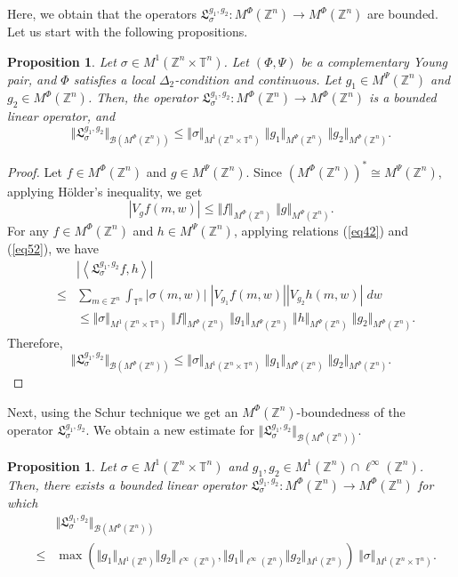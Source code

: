 \documentclass[a4paper,11pt, reqno]{amsart}
\theoremstyle{plain}
\newtheorem{proposition}[theorem]{Proposition}
\theoremstyle{definition}
\theoremstyle{remark}
\def \Z{{\mathbb Z}}
\def \T{{\mathbb T}}
\begin{document}
Here, we obtain that the operators $\mathfrak{L}^{g_1, g_2}_{\sigma} : M^{\Phi}(\Z^n) \to M^{\Phi}(\Z^n)$ are bounded. Let us start with the following propositions.
\begin{proposition}\label{pro4}  
Let $\sigma \in M^1(\Z^n \times \T^n)$. Let $\left(\Phi, \Psi \right)$ be a complementary Young pair, and $\Phi$ satisfies a local $\Delta_2$-condition and continuous. Let $g_1 \in  M^{\Psi}(\Z^n)$ and $g_2 \in M^{\Phi}(\Z^n)$. Then, the operator $\mathfrak{L}^{g_1, g_2}_{\sigma}: M^{\Phi}(\Z^n) \to M^{\Phi}(\Z^n)$ is a bounded linear operator, and 
\[\Vert \mathfrak{L}^{g_1, g_2}_{\sigma} \Vert_{\mathcal{B}(M^{\Phi}(\Z^n))} \leq  \Vert \sigma  \Vert_{M^1(\Z^n \times \T^n)} \; \Vert g_1 \Vert_{ M^{\Psi}(\Z^n)} \; \Vert g_2 \Vert_{M^{\Phi}(\Z^n)}. \] 
\end{proposition}
\begin{proof}
Let $f \in M^{\Phi}(\Z^n)$ and $g \in M^{\Psi}(\Z^n)$. Since $(M^{\Phi}(\Z^n))^* \cong M^{\Psi}(\Z^n)$, applying H\"older's inequality, we get
\begin{equation}\label{eq52}
\left| V_{g} f (m, w) \right| \leq \Vert f  \Vert_{M^{\Phi}(\Z^n)} \; \Vert g  \Vert_{M^{\Psi}(\Z^n)}. 
\end{equation} 
For any $f \in M^{\Phi}(\Z^n)$ and $h \in M^{\Psi}(\Z^n)$, applying relations (\ref{eq42}) and (\ref{eq52}), we have
\begin{eqnarray*}
&& \left| \left\langle \mathfrak{L}^{g_1, g_2}_{\sigma}f, h \right\rangle \right| \\
& \leq & \sum_{m \in \Z^n}  \int_{\T^n} |\sigma(m, w)| \; \left|V_{g_1}f(m, w) \right| \left|   V_{g_2}h(m, w) \right| \; dw \\
&& \leq \Vert \sigma \Vert_{M^1(\Z^n \times \T^n)} \; \Vert f \Vert_{M^{\Phi}(\Z^n)} \;  \Vert g_1 \Vert_{M^{\Psi}(\Z^n)} \; \Vert h \Vert_{M^{\Psi}(\Z^n)} \; \Vert g_2 \Vert_{M^{\Phi}(\Z^n)}. 
\end{eqnarray*}
Therefore,
\[\Vert \mathfrak{L}^{g_1, g_2}_{\sigma} \Vert_{\mathcal{B}(M^{\Phi}(\Z^n))} \leq  \Vert \sigma  \Vert_{M^1(\Z^n \times \T^n)} \; \Vert g_1 \Vert_{ M^{\Psi}(\Z^n)} \; \Vert g_2 \Vert_{M^{\Phi}(\Z^n)}. \] 
\end{proof}
Next, using the Schur technique we get an $M^{\Phi}(\Z^n)$-boundedness of the operator $\mathfrak{L}^{g_1, g_2}_{\sigma}$. We obtain a new estimate for $\Vert \mathfrak{L}^{g_1, g_2}_{\sigma} \Vert_{\mathcal{B}(M^{\Phi}(\Z^n))}$. 
\begin{proposition}\label{pro5}
Let $\sigma \in M^1(\Z^n \times \T^n)$ and $g_1, g_2 \in  M^1(\Z^n) \cap \ell^\infty(\Z^n)$. Then, there exists a bounded linear operator $\mathfrak{L}^{g_1, g_2}_{\sigma}: M^{\Phi}(\Z^n) \to  M^{\Phi}(\Z^n) $ for which
\begin{eqnarray*}
&& \Vert \mathfrak{L}^{g_1, g_2}_{\sigma} \Vert_{\mathcal{B}(M^{\Phi}(\Z^n))} \\
& \leq & \max(\Vert g_1 \Vert_{M^1(\Z^n)} \Vert g_2 \Vert_{\ell^\infty(\Z^n)}, \Vert g_1 \Vert_{\ell^\infty(\Z^n)} \Vert g_2 \Vert_{M^1(\Z^n)}) \; \Vert \sigma \Vert_{M^1(\Z^n \times \T^n)}.
\end{eqnarray*}
\end{proposition}
\end{document}
